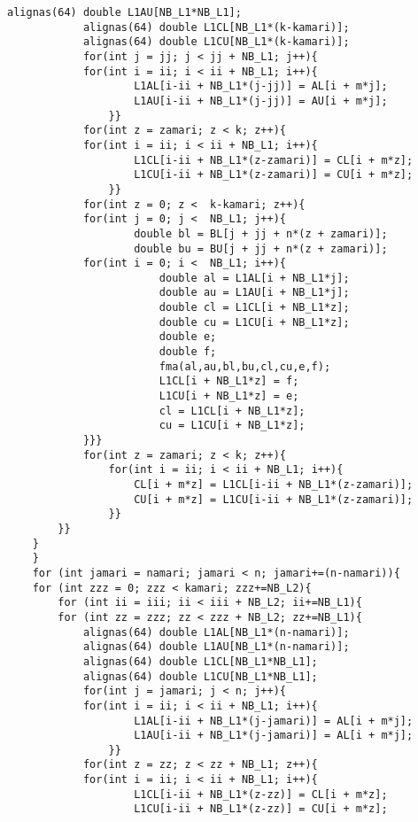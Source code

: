 \documentclass[11pt,a4paper]{jsreport}
\theoremstyle{definition}
\begin{document}
\begin{lstlisting}[caption = 本研究で使用したプログラム]
            alignas(64) double L1AU[NB_L1*NB_L1];
            alignas(64) double L1CL[NB_L1*(k-kamari)];
            alignas(64) double L1CU[NB_L1*(k-kamari)];
            for(int j = jj; j < jj + NB_L1; j++){
            for(int i = ii; i < ii + NB_L1; i++){
                    L1AL[i-ii + NB_L1*(j-jj)] = AL[i + m*j];
                    L1AU[i-ii + NB_L1*(j-jj)] = AU[i + m*j];
                }}
            for(int z = zamari; z < k; z++){
            for(int i = ii; i < ii + NB_L1; i++){
                    L1CL[i-ii + NB_L1*(z-zamari)] = CL[i + m*z];
                    L1CU[i-ii + NB_L1*(z-zamari)] = CU[i + m*z];
                }}
            for(int z = 0; z <  k-kamari; z++){
            for(int j = 0; j <  NB_L1; j++){
                    double bl = BL[j + jj + n*(z + zamari)];
                    double bu = BU[j + jj + n*(z + zamari)];
            for(int i = 0; i <  NB_L1; i++){
                        double al = L1AL[i + NB_L1*j];
                        double au = L1AU[i + NB_L1*j];
                        double cl = L1CL[i + NB_L1*z];
                        double cu = L1CU[i + NB_L1*z];
                        double e;
                        double f;
                        fma(al,au,bl,bu,cl,cu,e,f);
                        L1CL[i + NB_L1*z] = f;
                        L1CU[i + NB_L1*z] = e;
                        cl = L1CL[i + NB_L1*z];
                        cu = L1CU[i + NB_L1*z];
            }}}
            for(int z = zamari; z < k; z++){
                for(int i = ii; i < ii + NB_L1; i++){
                    CL[i + m*z] = L1CL[i-ii + NB_L1*(z-zamari)];
                    CU[i + m*z] = L1CU[i-ii + NB_L1*(z-zamari)];
                }}
        }}
    }
    }
    for (int jamari = namari; jamari < n; jamari+=(n-namari)){
    for (int zzz = 0; zzz < kamari; zzz+=NB_L2){
        for (int ii = iii; ii < iii + NB_L2; ii+=NB_L1){
        for (int zz = zzz; zz < zzz + NB_L2; zz+=NB_L1){
            alignas(64) double L1AL[NB_L1*(n-namari)];
            alignas(64) double L1AU[NB_L1*(n-namari)];
            alignas(64) double L1CL[NB_L1*NB_L1];
            alignas(64) double L1CU[NB_L1*NB_L1];
            for(int j = jamari; j < n; j++){
            for(int i = ii; i < ii + NB_L1; i++){
                    L1AL[i-ii + NB_L1*(j-jamari)] = AL[i + m*j];
                    L1AU[i-ii + NB_L1*(j-jamari)] = AL[i + m*j];
                }}
            for(int z = zz; z < zz + NB_L1; z++){
            for(int i = ii; i < ii + NB_L1; i++){
                    L1CL[i-ii + NB_L1*(z-zz)] = CL[i + m*z];
                    L1CU[i-ii + NB_L1*(z-zz)] = CU[i + m*z];

\end{lstlisting}
\end{document}
